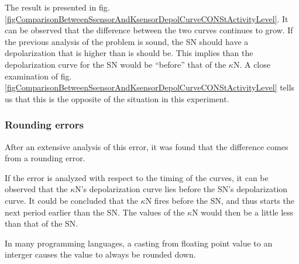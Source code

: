 The result is presented in fig. \ref{figComparisonBetweenSsensorAndKsensorDepolCurveCONStActivityLevel}. %
It can be observed that the difference between the two curves continues to grow.
If the previous analysis of the problem is sound, the SN should have a depolarization that is higher than is should be.
This implies than the depolarization curve for the SN would be ``before'' that of the $\kappa$N.
A close examination of fig. \ref{figComparisonBetweenSsensorAndKsensorDepolCurveCONStActivityLevel} tells us that this is the opposite of the situation in this experiment.



	\subsubsection{Rounding errors}
After an extensive analysis of this error, it was found that the difference comes from a rounding error.

If the error is analyzed with respect to the timing of the curves, it can be observed that the $\kappa$N's depolarization curve lies before the SN's depolarization curve.
It could be concluded that the $\kappa$N fires before the SN, and thus starts the next period earlier than the SN.
The values of the $\kappa$N would then be a little less than that of the SN.

In many programming languages, a casting from floating point value to an interger causes the value to always be rounded down.


